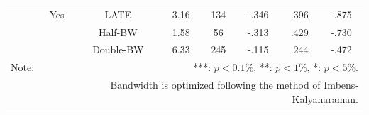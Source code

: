 \documentclass[dvipdfmx, 12pt]{article}
\begin{document}
\begin{table}[!]
\begin{tabular}{lccccccc}
    & Yes & LATE & 3.16 & 134 & -.346 & .396 & -.875 \\
    & & Half-BW & 1.58 & 56 & -.313 & .429 & -.730 \\
    & & Double-BW & 6.33 & 245 & -.115 & .244 & -.472 \\ \hline

    Note: & \multicolumn{7}{r}{***: $p<0.1\%$, **: $p<1\%$, *: $p<5\%$.} \\
    & \multicolumn{7}{r}{Bandwidth is optimized following the method of Imbens-Kalyanaraman.}
  \end{tabular}
\end{table}

\begin{landscape}
  \begin{table}
    
  \end{table}
\end{landscape}

\begin{landscape}
  \begin{table}
    
  \end{table}
\end{landscape}

\begin{landscape}
  \begin{table}
    
  \end{table}
\end{landscape}


\begin{landscape}
  \begin{table}
    
  \end{table}
\end{landscape}

\begin{landscape}
  \begin{table}
    
  \end{table}
\end{landscape}

\begin{landscape}
  \begin{table}
    
  \end{table}
\end{landscape}

\begin{landscape}
  \begin{table}
    
  \end{table}
\end{landscape}
\end{document}
